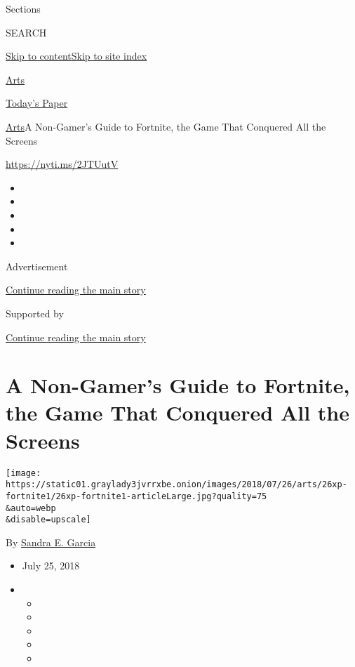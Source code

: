 Sections

SEARCH

\protect\hyperlink{site-content}{Skip to
content}\protect\hyperlink{site-index}{Skip to site index}

\href{https://www.nytimes3xbfgragh.onion/section/arts}{Arts}

\href{https://myaccount.nytimes3xbfgragh.onion/auth/login?response_type=cookie\&client_id=vi}{}

\href{https://www.nytimes3xbfgragh.onion/section/todayspaper}{Today's
Paper}

\href{/section/arts}{Arts}\textbar{}A Non-Gamer's Guide to Fortnite, the
Game That Conquered All the Screens

\href{https://nyti.ms/2JTUutV}{https://nyti.ms/2JTUutV}

\begin{itemize}
\item
\item
\item
\item
\item
\end{itemize}

Advertisement

\protect\hyperlink{after-top}{Continue reading the main story}

Supported by

\protect\hyperlink{after-sponsor}{Continue reading the main story}

\hypertarget{a-non-gamers-guide-to-fortnite-the-game-that-conquered-all-the-screens}{%
\section{A Non-Gamer's Guide to Fortnite, the Game That Conquered All
the
Screens}\label{a-non-gamers-guide-to-fortnite-the-game-that-conquered-all-the-screens}}

\texttt{[image: https://static01.graylady3jvrrxbe.onion/images/2018/07/26/arts/26xp-fortnite1/26xp-fortnite1-articleLarge.jpg?quality=75\\\&auto=webp\\\&disable=upscale]}

By \href{https://www.nytimes3xbfgragh.onion/by/sandra-e-garcia}{Sandra
E. Garcia}

\begin{itemize}
\item
  July 25, 2018
\item
  \begin{itemize}
  \item
  \item
  \item
  \item
  \item
  \end{itemize}
\end{itemize}

